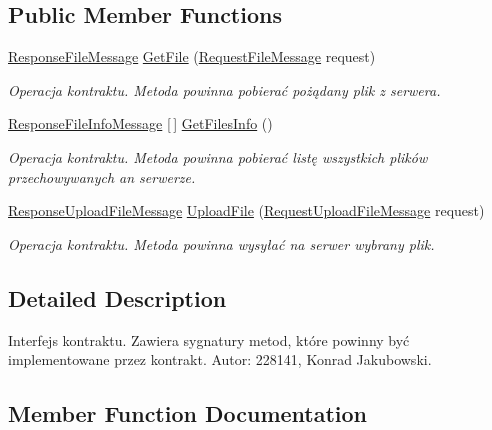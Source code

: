 \subsection*{Public Member Functions}
\begin{DoxyCompactItemize}
\item 
\hyperlink{class_wcf_stream_service_contract_1_1_response_file_message}{Response\+File\+Message} \hyperlink{interface_wcf_stream_service_contract_1_1_i_strumien_a4a6bde2f298213a20537461a4a2bf384}{Get\+File} (\hyperlink{class_wcf_stream_service_contract_1_1_request_file_message}{Request\+File\+Message} request)
\begin{DoxyCompactList}\small\item\em Operacja kontraktu. Metoda powinna pobierać pożądany plik z serwera. \end{DoxyCompactList}\item 
\hyperlink{class_wcf_stream_service_contract_1_1_response_file_info_message}{Response\+File\+Info\+Message} \mbox{[}$\,$\mbox{]} \hyperlink{interface_wcf_stream_service_contract_1_1_i_strumien_ae0e59eb415597d2af101adaa7e33032d}{Get\+Files\+Info} ()
\begin{DoxyCompactList}\small\item\em Operacja kontraktu. Metoda powinna pobierać listę wszystkich plików przechowywanych an serwerze. \end{DoxyCompactList}\item 
\hyperlink{class_wcf_stream_service_contract_1_1_response_upload_file_message}{Response\+Upload\+File\+Message} \hyperlink{interface_wcf_stream_service_contract_1_1_i_strumien_a1a1d9e27098173c02ad173ace1ef97e3}{Upload\+File} (\hyperlink{class_wcf_stream_service_contract_1_1_request_upload_file_message}{Request\+Upload\+File\+Message} request)
\begin{DoxyCompactList}\small\item\em Operacja kontraktu. Metoda powinna wysyłać na serwer wybrany plik. \end{DoxyCompactList}\end{DoxyCompactItemize}


\subsection{Detailed Description}
Interfejs kontraktu. Zawiera sygnatury metod, które powinny być implementowane przez kontrakt. Autor\+: 228141, Konrad Jakubowski. 



\subsection{Member Function Documentation}
\mbox{\label{interface_wcf_stream_service_contract_1_1_i_strumien_a4a6bde2f298213a20537461a4a2bf384}} 
